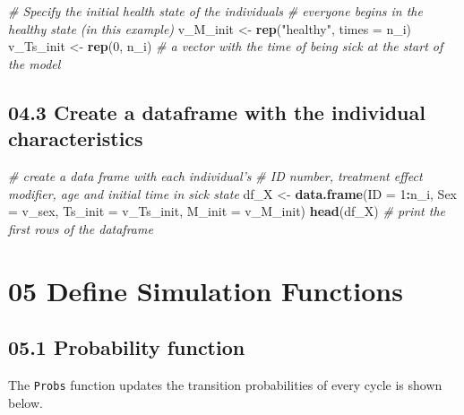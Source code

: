 \documentclass[]{article}
\newenvironment{Shaded}{\begin{snugshade}}{\end{snugshade}}
\newcommand{\KeywordTok}[1]{\textcolor[rgb]{0.13,0.29,0.53}{\textbf{#1}}}
\newcommand{\DataTypeTok}[1]{\textcolor[rgb]{0.13,0.29,0.53}{#1}}
\newcommand{\DecValTok}[1]{\textcolor[rgb]{0.00,0.00,0.81}{#1}}
\newcommand{\StringTok}[1]{\textcolor[rgb]{0.31,0.60,0.02}{#1}}
\newcommand{\CommentTok}[1]{\textcolor[rgb]{0.56,0.35,0.01}{\textit{#1}}}
\newcommand{\OperatorTok}[1]{\textcolor[rgb]{0.81,0.36,0.00}{\textbf{#1}}}
\newcommand{\NormalTok}[1]{#1}
\begin{document}
\begin{Shaded}
\begin{Highlighting}[]
\CommentTok{# Specify the initial health state of the individuals }
\CommentTok{# everyone begins in the healthy state (in this example)}
\NormalTok{v_M_init  <-}\StringTok{ }\KeywordTok{rep}\NormalTok{(}\StringTok{"healthy"}\NormalTok{, }\DataTypeTok{times =}\NormalTok{ n_i)   }
\NormalTok{v_Ts_init <-}\StringTok{ }\KeywordTok{rep}\NormalTok{(}\DecValTok{0}\NormalTok{, n_i)  }\CommentTok{# a vector with the time of being sick at the start of the model }
\end{Highlighting}
\end{Shaded}

\subsection{04.3 Create a dataframe with the individual
characteristics}\label{create-a-dataframe-with-the-individual-characteristics}

\begin{Shaded}
\begin{Highlighting}[]
\CommentTok{# create a data frame with each individual's }
\CommentTok{# ID number, treatment effect modifier, age and initial time in sick state }
\NormalTok{df_X  <-}\StringTok{ }\KeywordTok{data.frame}\NormalTok{(}\DataTypeTok{ID =} \DecValTok{1}\OperatorTok{:}\NormalTok{n_i, }\DataTypeTok{Sex =}\NormalTok{ v_sex, }\DataTypeTok{Ts_init =}\NormalTok{ v_Ts_init, }\DataTypeTok{M_init =}\NormalTok{ v_M_init)}
\KeywordTok{head}\NormalTok{(df_X) }\CommentTok{# print the first rows of the dataframe}
\end{Highlighting}
\end{Shaded}

\section{05 Define Simulation
Functions}\label{define-simulation-functions}

\subsection{05.1 Probability function}\label{probability-function}

The \texttt{Probs} function updates the transition probabilities of
every cycle is shown below.
\end{document}
